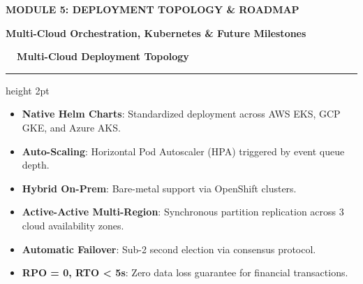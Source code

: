 \documentclass[landscape]{slides}
\newcommand{\slidetitle}[1]{%
  {\Large\bfseries\color{NavyDark} #1}\par\vspace{0.3em}%
  {\color{TealAccent}\hrule height 2pt}\vspace{0.6em}%
}
\newcommand{\sectionbanner}[2]{%
  \begin{center}
    \vspace*{1.2em}
    \begin{tcolorbox}[colback=NavyDark,colframe=TealAccent,arc=4pt,boxrule=1.5pt,center,width=0.9\textwidth]
      \centering
      \vspace{0.4em}
      {\Huge\bfseries\color{white} #1}\par\vspace{0.5em}
      {\large\color{TealAccent}\bfseries #2}
      \vspace{0.4em}
    \end{tcolorbox}
  \end{center}
}
\begin{document}
\begin{slide}
\sectionbanner{MODULE 5: DEPLOYMENT TOPOLOGY \& ROADMAP}{Multi-Cloud Orchestration, Kubernetes \& Future Milestones}
\end{slide}

\begin{slide}
\slidetitle{\faCloud~~Multi-Cloud Deployment Topology}

\begin{minipage}[t]{0.48\textwidth}
  \begin{tcolorbox}[colback=CardBg,colframe=NavyDark,title=\textbf{\faServer~~Kubernetes Container Orchestration}]
    \small
    \begin{itemize}
      \item \textbf{Native Helm Charts}: Standardized deployment across AWS EKS, GCP GKE, and Azure AKS.
      \item \textbf{Auto-Scaling}: Horizontal Pod Autoscaler (HPA) triggered by event queue depth.
      \item \textbf{Hybrid On-Prem}: Bare-metal support via OpenShift clusters.
    \end{itemize}
  \end{tcolorbox}
\end{minipage}%
\hfill
\begin{minipage}[t]{0.48\textwidth}
  \begin{tcolorbox}[colback=CardBg,colframe=TealAccent,title=\textbf{\faNetworkWired~~High Availability \& Resiliency}]
    \small
    \begin{itemize}
      \item \textbf{Active-Active Multi-Region}: Synchronous partition replication across 3 cloud availability zones.
      \item \textbf{Automatic Failover}: Sub-2 second election via consensus protocol.
      \item \textbf{RPO = 0, RTO < 5s}: Zero data loss guarantee for financial transactions.
    \end{itemize}
  \end{tcolorbox}
\end{minipage}
\end{slide}
\end{document}
